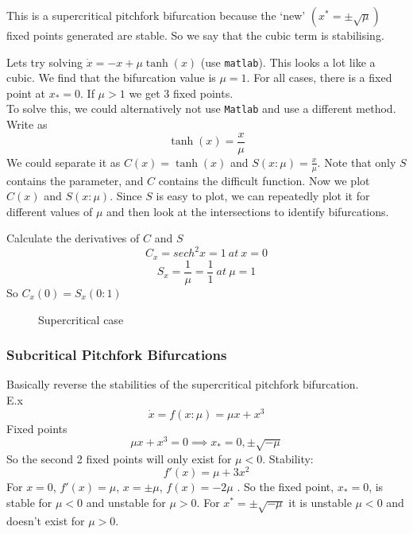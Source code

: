\documentclass{X:/Documents/Coding/Latex/myassignment}
\begin{document}
This is a supercritical pitchfork bifurcation because the `new' $(x^* = \pm \sqrt{\mu})$ fixed points generated are stable. So we say that the cubic term is stabilising.



Lets try solving $\dot{x} = -x + \mu \tanh(x)$ (use \verb|matlab|). This looks a lot like a cubic.
We find that the bifurcation value is $\mu = 1$. For all cases, there is a fixed point at $x_* = 0$. If $\mu >1$ we get 3 fixed points. \\
To solve this, we could alternatively not use \verb|Matlab| and use a different method. Write as
\[\tanh(x) = \frac{x}{\mu}\]
We could separate it as $C(x) = \tanh(x)$ and $S(x:\mu) =\frac{x}{\mu}$. Note that only $S$ contains the parameter, and $C$ contains the difficult function. Now we plot $C(x)$ and $S(x:\mu)$. Since $S$ is easy to plot, we can repeatedly plot it for different values of $\mu$ and then look at the intersections to identify bifurcations. 

Calculate the derivatives of $C$ and $S$
\[C_x = sech^2 x =1 \ at \ x=0 \]
\[S_x = \frac1\mu = \frac11 \ at \ \mu = 1\]
So $C_x(0) = S_x(0:1)$

\begin{figure}[h]
\centering
{}
\caption{Supercritical case}
\end{figure}


\subsubsection{Subcritical Pitchfork Bifurcations}
Basically reverse the stabilities of the supercritical pitchfork bifurcation. \\
E.x 
\[\dot{x} = f(x:\mu) = \mu x + x^3\]
Fixed points 
\[\mu x + x^3 = 0 \implies x_* = 0 , \pm \sqrt{-\mu}\]
So the second 2 fixed points will only exist for $\mu < 0$.
Stability:
\[f'(x) = \mu + 3x^2\]
For $x= 0$, $f'(x) = \mu$, $x=\pm\mu$, $f(x) = -2\mu$ .
So the fixed point, $x_*=0$,  is stable for $\mu <0$ and unstable for $\mu >0$.
For $x^* = \pm \sqrt{-\mu}$ it is unstable $\mu <0$ and doesn't exist for $\mu >0$.
\end{document}
